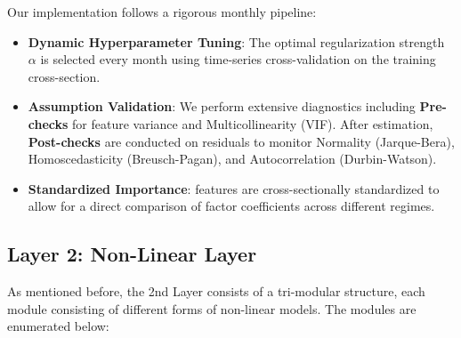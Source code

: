 \documentclass[11pt]{article}
\begin{document}
Our implementation follows a rigorous monthly pipeline:

\begin{itemize}
    \item \textbf{Dynamic Hyperparameter Tuning}: The optimal regularization strength $\alpha$ is selected every month using time-series cross-validation on the training cross-section.
    \item \textbf{Assumption Validation}: We perform extensive diagnostics including \textbf{Pre-checks} for feature variance and Multicollinearity (VIF). After estimation, \textbf{Post-checks} are conducted on residuals to monitor Normality (Jarque-Bera), Homoscedasticity (Breusch-Pagan), and Autocorrelation (Durbin-Watson).
    \item \textbf{Standardized Importance}: features are cross-sectionally standardized to allow for a direct comparison of factor coefficients across different regimes.
\end{itemize}

\subsection{Layer 2: Non-Linear Layer}
As mentioned before, the 2nd Layer consists of a tri-modular structure, each module consisting of different forms of non-linear models. The modules are enumerated below:
\end{document}
